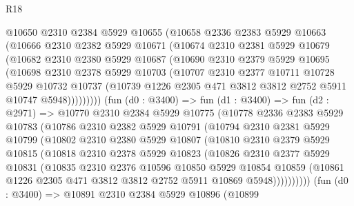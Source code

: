 \begin{lexlean}{R18}
\begin{coremodule}
        @10650
          @2310
          @2384
          @5929
          @10655
          (@10658
            @2336
            @2383
            @5929
            @10663
            (@10666
              @2310
              @2382
              @5929
              @10671
              (@10674
                @2310
                @2381
                @5929
                @10679
                (@10682
                  @2310
                  @2380
                  @5929
                  @10687
                  (@10690
                    @2310
                    @2379
                    @5929
                    @10695
                    (@10698
                      @2310
                      @2378
                      @5929
                      @10703
                      (@10707
                        @2310
                        @2377
                        @10711
                        @10728
                        @5929
                        @10732
                        @10737
                        (@10739 @1226 @2305 @471 @3812 @3812 @2752 @5911 @10747 @5948)))))))))
        (fun (d0 : @3400) =>
        fun (d1 : @3400) =>
        fun (d2 : @2971) =>
        @10770
          @2310
          @2384
          @5929
          @10775
          (@10778
            @2336
            @2383
            @5929
            @10783
            (@10786
              @2310
              @2382
              @5929
              @10791
              (@10794
                @2310
                @2381
                @5929
                @10799
                (@10802
                  @2310
                  @2380
                  @5929
                  @10807
                  (@10810
                    @2310
                    @2379
                    @5929
                    @10815
                    (@10818
                      @2310
                      @2378
                      @5929
                      @10823
                      (@10826
                        @2310
                        @2377
                        @5929
                        @10831
                        (@10835
                          @2310
                          @2376
                          @10596
                          @10850
                          @5929
                          @10854
                          @10859
                          (@10861 @1226 @2305 @471 @3812 @3812 @2752 @5911 @10869 @5948))))))))))
        (fun (d0 : @3400) =>
        @10891
          @2310
          @2384
          @5929
          @10896
          (@10899

\end{coremodule}
\end{lexlean}
